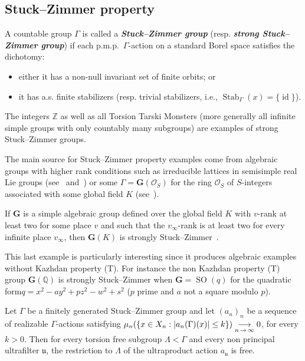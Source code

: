 \documentclass[AHL,Unicode,longabstracts,published]{cedram}
\newcommand{\defin}[1]{\textbf{\emph{#1}}}
\newcommand{\Zmath}{\mathbb{Z}}
\newcommand{\Qmath}{\mathbb{Q}}
\newcommand{\cO}{\mathcal{O}}
\newcommand{\bfG}{\mathbf{G}}
\DeclareMathOperator{\Stab}{Stab}
\DeclareMathOperator{\id}{id}
\DeclareMathOperator{\SO}{SO}
\newcommand{\ul}{\mathfrak{u}}
\newcommand{\pmp}{p.m.p.\ }
\begin{document}
\subsection{Stuck--Zimmer property}


A countable group $\Gamma$ is called a
\defin{Stuck--Zimmer group} (resp.
\defin{strong Stuck--Zimmer group}) if each \pmp $\Gamma$-action on a standard Borel space satisfies the dichotomy:
\begin{itemize}
\item[--] either it has a non-null invariant set of finite orbits; or
\item[--] it has a.s. finite stabilizers (resp. trivial stabilizers, i.e., $\Stab_{\Gamma}(x)=\{\id\}$).
\end{itemize}
\begin{exam}

The integers $\Zmath$ as well as all Torsion Tarski Monsters (more generally all infinite simple groups with only countably many subgroups) are examples of strong Stuck--Zimmer groups.

The main source for Stuck--Zimmer property examples come from algebraic groups with higher rank conditions such as irreducible lattices in semisimple real Lie groups (see~\cite{Stuck-Zimmer-1994} and~\cite{Creutz-Peterson-2017}) or some $\Gamma=\bfG(\cO_S)$ for the ring $\cO_S$ of $S$-integers associated with some global field $K$ (see~\cite[Theorem~10.8]{Creutz-Peterson-2017}).

If $\bfG$ is a simple algebraic group defined over the global field $K$ with $v$-rank at least two for some place $v$ and such that the $v_{\infty}$-rank is at least two for every infinite place $v_{\infty}$, then $\bfG(K)$ is strongly Stuck--Zimmer~\cite[Corollary~10.9]{Creutz-Peterson-2017}.

This last example is particularly interesting since it produces algebraic examples without Kazhdan property (T). For instance the non Kazhdan property (T) group $\bfG(\Qmath)$ is strongly Stuck--Zimmer when $\bfG=\SO(q)$ for the quadratic form\linebreak$q=x^2 - a y^2 + pz^2 - w^2 + s^2$ ($p$ prime and $a$ not a square modulo $p$).
\end{exam}

\begin{prop}\label{prop: Stuck-Zimmer gps and u-limits}
Let $\Gamma$ be a finitely generated Stuck--Zimmer group and let $(a_n)_n$ be a sequence of realizable $\Gamma$-actions satisfying $\mu_{n}(\{x\in X_n: \vert a_n(\Gamma) (x) \vert \linebreak\leq k\})\underset{n\,\to\,\infty}{\longrightarrow} 0$, for every $k>0$. Then for every torsion free subgroup $\Lambda<\Gamma$ and every non principal ultrafilter $\ul$, the restriction to $\Lambda$ of the ultraproduct action $a_{\ul}$ is free.
\end{prop}
\end{document}
